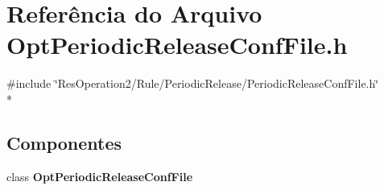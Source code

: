 \section{Referência do Arquivo Opt\+Periodic\+Release\+Conf\+File.\+h}
\label{_opt_periodic_release_conf_file_8h}
{\ttfamily \#include \char`\"{}Res\+Operation2/\+Rule/\+Periodic\+Release/\+Periodic\+Release\+Conf\+File.\+h\char`\"{}}\\*
\subsection*{Componentes}
\begin{DoxyCompactItemize}
\item 
class {\bf Opt\+Periodic\+Release\+Conf\+File}
\end{DoxyCompactItemize}
